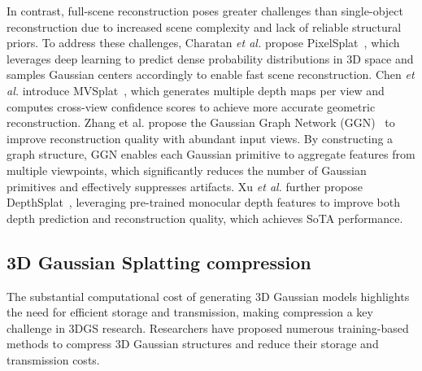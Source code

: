 \documentclass[lettersize,journal]{IEEEtran}
\begin{document}
In contrast, full-scene reconstruction poses greater challenges than single-object reconstruction due to increased scene complexity and lack of reliable structural priors. To address these challenges, Charatan \textit{et al.} propose PixelSplat~\cite{pixelsplat}, which leverages deep learning to predict dense probability distributions in 3D space and samples Gaussian centers accordingly to enable fast scene reconstruction. Chen \textit{et al.} introduce MVSplat~\cite{mvsplat}, which generates multiple depth maps per view and computes cross-view confidence scores to achieve more accurate geometric reconstruction.
Zhang et al. propose the Gaussian Graph Network (GGN)~\cite{zhang2024gaussian} to improve reconstruction quality with abundant input views. By constructing a graph structure, GGN enables each Gaussian primitive to aggregate features from multiple viewpoints, which significantly reduces the number of Gaussian primitives and effectively suppresses artifacts. 
Xu \textit{et al.} further propose DepthSplat~\cite{xu2024depthsplat}, leveraging pre-trained monocular depth features to improve both depth prediction and reconstruction quality, which achieves SoTA performance.


\subsection{3D Gaussian Splatting compression}
The substantial computational cost of generating 3D Gaussian models highlights the need for efficient storage and transmission, making compression a key challenge in 3DGS research.
Researchers have proposed numerous training-based methods to compress 3D Gaussian structures and reduce their storage and transmission costs.
\end{document}
